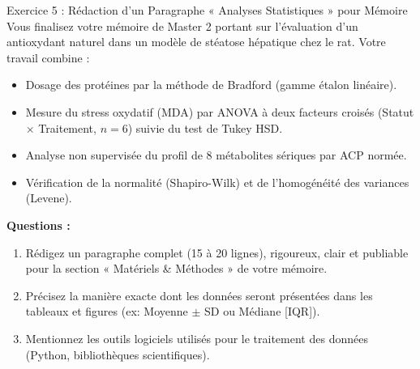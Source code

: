 \documentclass[11pt,a4paper]{article}
\begin{document}
\begin{exercicebox}{Exercice 5 : Rédaction d'un Paragraphe « Analyses Statistiques » pour Mémoire}
Vous finalisez votre mémoire de Master 2 portant sur l'évaluation d'un antioxydant naturel dans un modèle de stéatose hépatique chez le rat. Votre travail combine :
\begin{itemize}
  \item Dosage des protéines par la méthode de Bradford (gamme étalon linéaire).
  \item Mesure du stress oxydatif (MDA) par ANOVA à deux facteurs croisés (Statut $\times$ Traitement, $n=6$) suivie du test de Tukey HSD.
  \item Analyse non supervisée du profil de 8 métabolites sériques par ACP normée.
  \item Vérification de la normalité (Shapiro-Wilk) et de l'homogénéité des variances (Levene).
\end{itemize}

\textbf{Questions :}
\begin{enumerate}[label=\textbf{\alph*.}]
  \item Rédigez un paragraphe complet (15 à 20 lignes), rigoureux, clair et publiable pour la section « Matériels \& Méthodes » de votre mémoire.
  \item Précisez la manière exacte dont les données seront présentées dans les tableaux et figures (ex: Moyenne $\pm$ SD ou Médiane [IQR]).
  \item Mentionnez les outils logiciels utilisés pour le traitement des données (Python, bibliothèques scientifiques).
\end{enumerate}
\end{exercicebox}
\end{document}
